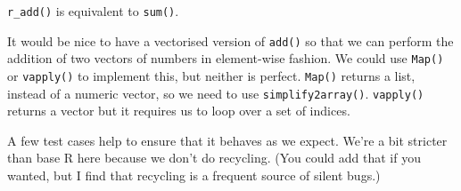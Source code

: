\texttt{r\_add()} is equivalent to \texttt{sum()}.

It would be nice to have a vectorised version of \texttt{add()} so that
we can perform the addition of two vectors of numbers in element-wise
fashion. We could use \texttt{Map()} or \texttt{vapply()} to implement
this, but neither is perfect. \texttt{Map()} returns a list, instead of
a numeric vector, so we need to use \texttt{simplify2array()}.
\texttt{vapply()} returns a vector but it requires us to loop over a set
of indices.

\begin{Shaded}
\begin{Highlighting}[]
\StringTok{ } \NormalTok{) \{}
  \NormalTok{(}\OperatorTok{==}\StringTok{ }
  \NormalTok{ (}\OperatorTok{==}\StringTok{ }\NormalTok{) }\NormalTok{(}\NormalTok{())}
  \NormalTok{(}
    \NormalTok{(}
\NormalTok{  )}
\NormalTok{\}}

\StringTok{ } \NormalTok{) \{}
  \NormalTok{(}\OperatorTok{==}\StringTok{ }
  \NormalTok{(}
    \NormalTok{(}\NormalTok{))}
\NormalTok{\}}
\end{Highlighting}
\end{Shaded}

A few test cases help to ensure that it behaves as we expect. We're a
bit stricter than base R here because we don't do recycling. (You could
add that if you wanted, but I find that recycling is a frequent source
of silent bugs.)

\begin{Shaded}
\begin{Highlighting}[]
\NormalTok{(}\OperatorTok{:}\NormalTok{, }\OperatorTok{:}\NormalTok{)}
\end{Highlighting}
\end{Shaded}

